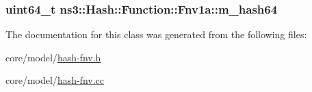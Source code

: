 \subsubsection[{\texorpdfstring{m\+\_\+hash64}{m_hash64}}]{\setlength{\rightskip}{0pt plus 5cm}uint64\+\_\+t ns3\+::\+Hash\+::\+Function\+::\+Fnv1a\+::m\+\_\+hash64\hspace{0.3cm}{\ttfamily [private]}}\hypertarget{classns3_1_1Hash_1_1Function_1_1Fnv1a_af9ce4f97da33186e95f8c8e30e6c016e}{}\label{classns3_1_1Hash_1_1Function_1_1Fnv1a_af9ce4f97da33186e95f8c8e30e6c016e}


The documentation for this class was generated from the following files\+:\begin{DoxyCompactItemize}
\item 
core/model/\hyperlink{hash-fnv_8h}{hash-\/fnv.\+h}\item 
core/model/\hyperlink{hash-fnv_8cc}{hash-\/fnv.\+cc}\end{DoxyCompactItemize}
